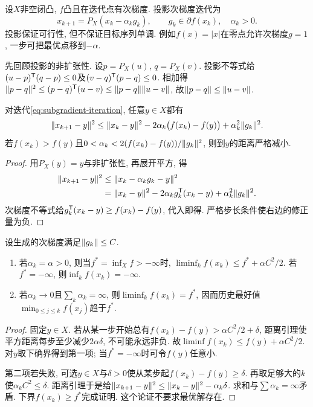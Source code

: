 设$X$非空闭凸, $f$凸且在迭代点有次梯度. 投影次梯度迭代为
\begin{equation}\label{eq:subgradient-iteration}
 x_{k+1}=P_X(x_k-\alpha_k g_k),\qquad g_k\in\partial f(x_k),\quad\alpha_k>0.
\end{equation}
投影保证可行性, 但不保证目标序列单调. 例如$f(x)=|x|$在零点允许次梯度$g=1$, 一步可把最优点移到$-\alpha$.

先回顾投影的非扩张性. 设$p=P_X(u)$, $q=P_X(v)$. 投影不等式给$(u-p)^{\mathsf T}(q-p)\le0$及$(v-q)^{\mathsf T}(p-q)\le0$. 相加得$\lVert p-q\rVert^2\le(p-q)^{\mathsf T}(u-v)\le\lVert p-q\rVert\lVert u-v\rVert$, 故$\lVert p-q\rVert\le\lVert u-v\rVert$.

\begin{lemma}\label{lem:subgradient-distance}
对迭代\eqref{eq:subgradient-iteration}, 任意$y\in X$都有
\[
 \lVert x_{k+1}-y\rVert^2\le\lVert x_k-y\rVert^2
 -2\alpha_k\bigl(f(x_k)-f(y)\bigr)+\alpha_k^2\lVert g_k\rVert^2.
\]
若$f(x_k)>f(y)$且$0<\alpha_k<2(f(x_k)-f(y))/\lVert g_k\rVert^2$, 则到$y$的距离严格减小.
\end{lemma}
\begin{proof}
用$P_X(y)=y$与非扩张性, 再展开平方, 得
\begin{align*}
 \lVert x_{k+1}-y\rVert^2&\le\lVert x_k-\alpha_k g_k-y\rVert^2\\
 &=\lVert x_k-y\rVert^2-2\alpha_k g_k^{\mathsf T}(x_k-y)+\alpha_k^2\lVert g_k\rVert^2.
\end{align*}
次梯度不等式给$g_k^{\mathsf T}(x_k-y)\ge f(x_k)-f(y)$, 代入即得. 严格步长条件使右边的修正量为负.
\end{proof}

\begin{theorem}\label{thm:subgradient-value}
设生成的次梯度满足$\lVert g_k\rVert\le C$.
\begin{enumerate}
\item 若$\alpha_k=\alpha>0$, 则当$f^*=\inf_X f> -\infty$时, $\liminf_k f(x_k)\le f^*+\alpha C^2/2$. 若$f^*=-\infty$, 则$\inf_k f(x_k)=-\infty$.
\item 若$\alpha_k\to0$且$\sum_k\alpha_k=\infty$, 则$\liminf_k f(x_k)=f^*$, 因而历史最好值$\min_{0\le j\le k}f(x_j)$趋于$f^*$.
\end{enumerate}
\end{theorem}
\begin{proof}
固定$y\in X$. 若从某一步开始总有$f(x_k)-f(y)>\alpha C^2/2+\delta$, 距离引理使平方距离每步至少减少$2\alpha\delta$, 不可能永远非负. 故$\liminf f(x_k)\le f(y)+\alpha C^2/2$. 对$y$取下确界得到第一项; 当$f^*=-\infty$时可令$f(y)$任意小.

第二项若失败, 可选$y\in X$与$\delta>0$使从某步起$f(x_k)-f(y)\ge\delta$. 再取足够大的$k$使$\alpha_k C^2\le\delta$. 距离引理于是给$\lVert x_{k+1}-y\rVert^2\le\lVert x_k-y\rVert^2-\alpha_k\delta$. 求和与$\sum\alpha_k=\infty$矛盾. 下界$f(x_k)\ge f^*$完成证明. 这个论证不要求最优解存在.
\end{proof}

